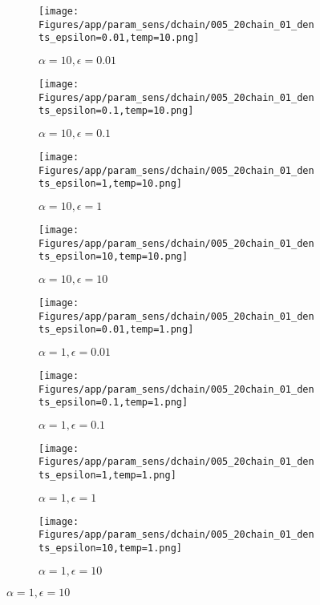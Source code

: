 \documentclass{article}
\theoremstyle{plain}
\begin{document}
\begin{appendices}
\begin{figure}
                \begin{subfigure}[b]{0.24\textwidth}
                    \centering
                    \texttt{[image: Figures/app/param\_sens/dchain/005\_20chain\_01\_dents\_epsilon=0.01,temp=10.png]}
                    \caption*{$\alpha=10,\epsilon=0.01$}
                \end{subfigure}
                \begin{subfigure}[b]{0.24\textwidth}
                    \centering
                    \texttt{[image: Figures/app/param\_sens/dchain/005\_20chain\_01\_dents\_epsilon=0.1,temp=10.png]}
                    \caption*{$\alpha=10,\epsilon=0.1$}
                \end{subfigure}
                \begin{subfigure}[b]{0.24\textwidth}
                    \centering
                    \texttt{[image: Figures/app/param\_sens/dchain/005\_20chain\_01\_dents\_epsilon=1,temp=10.png]}
                    \caption*{$\alpha=10,\epsilon=1$}
                \end{subfigure}
                \begin{subfigure}[b]{0.24\textwidth}
                    \centering
                    \texttt{[image: Figures/app/param\_sens/dchain/005\_20chain\_01\_dents\_epsilon=10,temp=10.png]}
                    \caption*{$\alpha=10,\epsilon=10$}
                \end{subfigure}
                
                \begin{subfigure}[b]{0.24\textwidth}
                    \centering
                    \texttt{[image: Figures/app/param\_sens/dchain/005\_20chain\_01\_dents\_epsilon=0.01,temp=1.png]}
                    \caption*{$\alpha=1,\epsilon=0.01$}
                \end{subfigure}
                \begin{subfigure}[b]{0.24\textwidth}
                    \centering
                    \texttt{[image: Figures/app/param\_sens/dchain/005\_20chain\_01\_dents\_epsilon=0.1,temp=1.png]}
                    \caption*{$\alpha=1,\epsilon=0.1$}
                \end{subfigure}
                \begin{subfigure}[b]{0.24\textwidth}
                    \centering
                    \texttt{[image: Figures/app/param\_sens/dchain/005\_20chain\_01\_dents\_epsilon=1,temp=1.png]}
                    \caption*{$\alpha=1,\epsilon=1$}
                \end{subfigure}
                \begin{subfigure}[b]{0.24\textwidth}
                    \centering
                    \texttt{[image: Figures/app/param\_sens/dchain/005\_20chain\_01\_dents\_epsilon=10,temp=1.png]}
                    \caption*{$\alpha=1,\epsilon=10$}
                \end{subfigure}
                

\end{figure}
\end{appendices}
\end{document}
